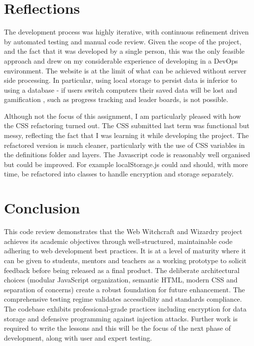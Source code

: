 \documentclass[a4paper, 12pt]{article}
\begin{document}
\section{Reflections}

The development process was highly iterative, with continuous refinement driven by automated testing and manual code review. Given the scope of the project, and the fact that it was developed by a single person, this was the only feasible approach and drew on my considerable experience of developing in a DevOps environment. The website is at the limit of what can be achieved without server side processing. In particular, using local storage to persist data is inferior to using a database - if users switch computers their saved data will be lost and gamification \citep{dicheva2015gamification}, such as progress tracking and leader boards, is not possible.

Although not the focus of this assignment, I am particularly pleased with how the CSS refactoring turned out. The CSS submitted last term was functional but messy, reflecting the fact that I was learning it while developing the project. The refactored version is much cleaner, particularly with the use of CSS variables in the definitions folder and layers. The Javascript code is reasonably well organised but could be improved. For example localStorage.js could and should, with more time, be refactored into classes to handle encryption and storage separately.

\section{Conclusion}

This code review demonstrates that the Web Witchcraft and Wizardry project achieves its academic objectives through well-structured, maintainable code adhering to web development best practices. It is at a level of maturity where it can be given to students, mentors and teachers as a working prototype to solicit feedback before being released as a final product. The deliberate architectural choices (modular JavaScript organization, semantic HTML, modern CSS and separation of concerns) create a robust foundation for future enhancement. The comprehensive testing regime validates accessibility and standards compliance. The codebase exhibits professional-grade practices including encryption for data storage and defensive programming against injection attacks. Further work is required to write the lessons and this will be the focus of the next phase of development, along with user and expert testing.
\end{document}
